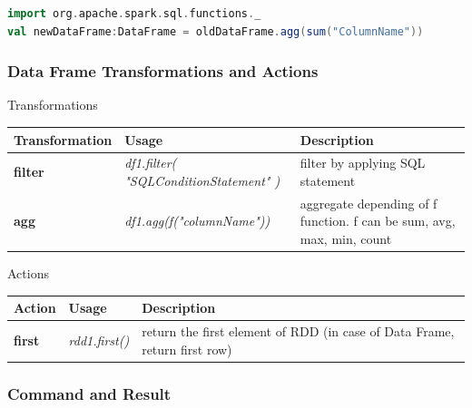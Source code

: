 \documentclass[slidetop,9pt,utf8]{beamer}
\begin{document}
\begin{CJK}{UTF8}{gbsn}
\begin{frame}[fragile]
  \begin{lstlisting}[label=AggregationByFunction, caption=Aggregation by a SQL Function, language=scala, style=code]
import org.apache.spark.sql.functions._
val newDataFrame:DataFrame = oldDataFrame.agg(sum("ColumnName"))
  \end{lstlisting}

\end{frame}

\begin{frame}

  \frametitle{Data Frame Transformations and Actions}

  \begin{block}{Transformations}
    \begin{center}
      \begin{tabular}{|m{2.1cm}|m{3.5cm}|m{5cm}|}
        \hline 
        \rowcolor{gray} \textbf{Transformation} & \textbf{Usage} & \textbf{Description} \\ \hline
        \textbf{filter} & \textit{df1.filter( \newline  "SQLConditionStatement" \newline )} & filter by applying SQL statement \\ \hline
        \textbf{agg} & \textit{df1.agg(f("columnName"))} & aggregate depending of f function. f can be sum, avg, max, min, count\\ \hline
      \end{tabular}
    \end{center}
  \end{block}

  \begin{block}{Actions}
    \begin{center}
      \begin{tabular}{|m{2.1cm}|m{3.5cm}|m{5cm}|}
        \hline 
        \rowcolor{gray} \textbf{Action} & \textbf{Usage} & \textbf{Description} \\ \hline
        \textbf{first} & \textit{rdd1.first()} & return the first element of RDD (in case of Data Frame, return first row) \\ \hline
      \end{tabular}
    \end{center}
  \end{block}

\end{frame}

\begin{frame}[fragile]
  \frametitle{Command and Result}


\end{frame}
\end{CJK}
\end{document}
